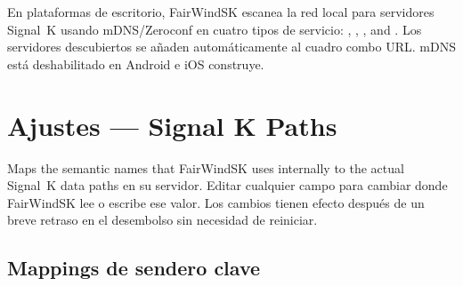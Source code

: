 En plataformas de escritorio, FairWindSK escanea la red local para servidores Signal~K usando
mDNS/Zeroconf en cuatro tipos de servicio:
, , ,
and .
Los servidores descubiertos se añaden automáticamente al cuadro combo URL.
mDNS está deshabilitado en Android e iOS construye.

\chapter{Ajustes --- Signal K Paths}
\label{ch:settings-signalk}

Maps the semantic names that FairWindSK uses internally to the actual Signal~K data paths
en su servidor.
Editar cualquier campo para cambiar donde FairWindSK lee o escribe ese valor.
Los cambios tienen efecto después de un breve retraso en el desembolso sin necesidad de reiniciar.


\section{Mappings de sendero clave}

